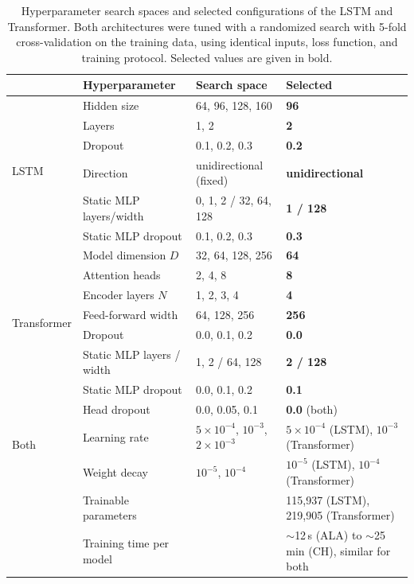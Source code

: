 \documentclass[draft]{agujournal2019}
\begin{document}
\clearpage
\begin{table}[ht]
\centering
\caption{Hyperparameter search spaces and selected configurations of the LSTM and Transformer. Both architectures were tuned with a randomized search with 5-fold cross-validation on the training data, using identical inputs, loss function, and training protocol. Selected values are given in bold.}
\label{tab:hyperparameters}
\small
\begin{tabular}{llll}
\toprule
 & Hyperparameter & Search space & Selected \\
\midrule
\multirow{6}{*}{LSTM}
 & Hidden size & 64, 96, 128, 160 & \textbf{96} \\
 & Layers & 1, 2 & \textbf{2} \\
 & Dropout & 0.1, 0.2, 0.3 & \textbf{0.2} \\
 & Direction & unidirectional (fixed) & \textbf{unidirectional} \\
 & Static MLP layers/width & 0, 1, 2 / 32, 64, 128 & \textbf{1 / 128} \\
 & Static MLP dropout & 0.1, 0.2, 0.3 & \textbf{0.3} \\
\midrule
\multirow{7}{*}{Transformer}
 & Model dimension $D$ & 32, 64, 128, 256 & \textbf{64} \\
 & Attention heads & 2, 4, 8 & \textbf{8} \\
 & Encoder layers $N$ & 1, 2, 3, 4 & \textbf{4} \\
 & Feed-forward width & 64, 128, 256 & \textbf{256} \\
 & Dropout & 0.0, 0.1, 0.2 & \textbf{0.0} \\
 & Static MLP layers / width & 1, 2 / 64, 128 & \textbf{2 / 128} \\
 & Static MLP dropout & 0.0, 0.1, 0.2 & \textbf{0.1} \\
\midrule
\multirow{3}{*}{Both}
 & Head dropout & 0.0, 0.05, 0.1 & \textbf{0.0} (both) \\
 & Learning rate & $5\times10^{-4}$, $10^{-3}$, $2\times10^{-3}$ & \textbf{$5\times10^{-4}$} (LSTM), \textbf{$10^{-3}$} (Transformer) \\
 & Weight decay & $10^{-5}$, $10^{-4}$ & \textbf{$10^{-5}$} (LSTM), \textbf{$10^{-4}$} (Transformer) \\
\midrule
 & Trainable parameters & & 115,937 (LSTM), 219,905 (Transformer) \\
  & Training time per model & & $\sim$12\,s (ALA) to $\sim$25\,min (CH), similar for both \\
\bottomrule
\end{tabular}
\end{table}
\end{document}
